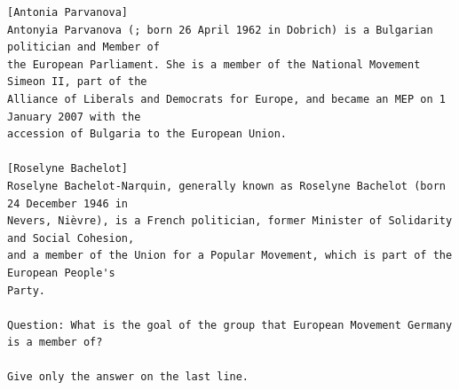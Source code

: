 \documentclass[10pt]{article}
\begin{document}
\begin{verbatim}
[Antonia Parvanova]
Antonyia Parvanova (; born 26 April 1962 in Dobrich) is a Bulgarian politician and Member of
the European Parliament. She is a member of the National Movement Simeon II, part of the
Alliance of Liberals and Democrats for Europe, and became an MEP on 1 January 2007 with the
accession of Bulgaria to the European Union.

[Roselyne Bachelot]
Roselyne Bachelot-Narquin, generally known as Roselyne Bachelot (born 24 December 1946 in
Nevers, Nièvre), is a French politician, former Minister of Solidarity and Social Cohesion,
and a member of the Union for a Popular Movement, which is part of the European People's
Party.

Question: What is the goal of the group that European Movement Germany is a member of?

Give only the answer on the last line.
\end{verbatim}
\end{document}
